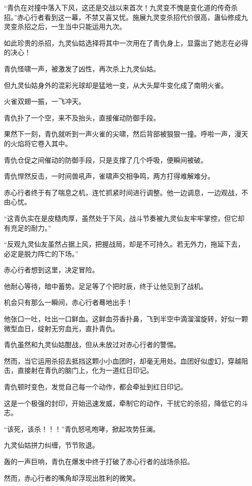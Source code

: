 \begin{this_body}
“青仇在对撞中落入下风，这还是交战以来首次！九灵变不愧是变化道的传奇杀招。”赤心行者看到这一幕，不禁又喜又忧。施展九灵变杀招代价很高，蛊仙修成九灵变杀招之后，一生当中只能运用九次。

如此珍贵的杀招，九灵仙姑选择将其中一次用在了青仇身上，显露出了她志在必得的决心！

青仇怪啸一声，被激发了凶性，再次杀上九灵仙姑。

但九灵仙姑身外的混彩光球却是猛地一变，从大头犀牛变化成了南明火雀。

火雀双翅一振，一飞冲天。

青仇扑了一个空，来不及抬头，直接催动防御手段。

果然下一刻，青仇就听到一声火雀的尖啸，然后背部被狠狠一撞。呼啦一声，漫天的火焰将它卷入其中。

青仇仓促之间催动的防御手段，只是支撑了几个呼吸，便瞬间被破。

青仇悍然反击，一时间兽吼声，雀啸声交相争鸣，两方打得难解难分。

赤心行者终于有了喘息之机，连忙抓紧时间进行调整。他一边调息，一边观战，不由心忧。

“这青仇实在是皮糙肉厚，虽然处于下风，战斗节奏被九灵仙友牢牢掌控，但它却有充足的耐力。”

“反观九灵仙友虽然占据上风，把握战局，却是不可持久。若无外力，拖延下去，必定是脱力阵亡的下场。”

赤心行者想到这里，决定冒险。

他耐心等待，暗中蓄势。足足等了个把时辰，终于让他见到了战机。

机会只有那么一瞬间，赤心行者蓦地出手！

他张口一吐，吐出一口鲜血。这鲜血芬香扑鼻，飞到半空中滴溜溜旋转，好似一颗微型血日，绽射无穷血光，直扑青仇。

青仇虽然和九灵仙姑酣战，但从未放过对赤心行者的警惕。

然而，当它运用杀招去抵挡这颗小小血团时，却毫无用处。血团好似虚幻，穿越阻击，直接射在青仇的脑门上，化为一道红日印记。

青仇顿时变色，发觉自己每一个动作，都会牵扯到红日印记。

这是一个极强的封印，开始迅速发威，牵制它的动作，干扰它的杀招，降低它的斗志。

“该死，该杀！！！”青仇怒吼咆哮，掀起攻势狂澜。

九灵仙姑拼力纠缠，节节败退。

轰的一声巨响，青仇在爆发中终于打破了赤心行者的战场杀招。

然而，赤心行者的嘴角却浮现出胜利的微笑。


\end{this_body}
